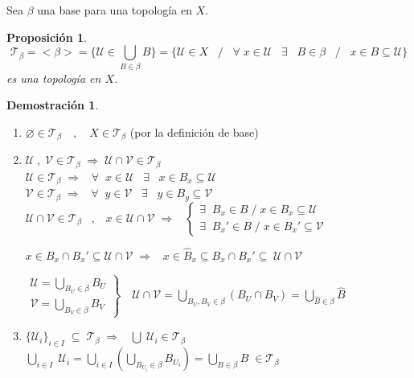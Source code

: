 \documentclass[12pt,twoside]{report}
\newcommand\mc[1]{\mathcal{#1}}
\theoremstyle{azul}
\theoremstyle{azul2}
\theoremstyle{plain}
\newtheorem*{prop}{Proposición}
\theoremstyle{definition}
\newtheorem*{dem}{Demostración}
\theoremstyle{remark}
\begin{document}
Sea $\beta$ una base para una topología en $X$.
\begin{prop}
\;
$$\mc{T}_{\beta} = < \beta > = \{ \mathcal{U} \in \underset{B \in \beta}{\bigcup} B \} = \{ \mathcal{U} \in X \;\;\; / \;\;\; \forall \; x \in \mathcal{U} \;\;\; \exists \;\;\; B \in \beta \;\;\; /\;\; \; x \in B \subseteq \mathcal{U}\}$$
es una topología en $X$.
\end{prop}
\begin{dem} \:
\begin{enumerate} 
\item $\varnothing \in \mc{T}_{\beta} \quad , \quad X \in \mc{T}_{\beta}$ (por la definición de base)
\item $\mathcal{U} \; ,\; \mathcal{V} \in \mc{T}_{\beta} \; \Rightarrow \; \mathcal{U} \cap \mathcal{V} \in \mc{T}_{\beta}$ \\
$\mathcal{U} \in \mc{T}_{\beta} \; \Rightarrow \;\;\; \forall \;\; x \in \mathcal{U}  \;\;\; \exists \;\;\; x \in B_x \subseteq \mathcal{U}$ \\
$\mathcal{V} \in \mc{T}_{\beta} \; \Rightarrow \;\;\; \forall \;\; y \in \mathcal{V}  \;\;\; \exists \;\;\; y \in B_y \subseteq \mathcal{V}$ \\
\vspace{3mm}$ \mathcal{U} \cap \mathcal{V} \in \mc{T}_{\beta} \;\;\; , \;\;\; x \in  \mathcal{U} \cap \mathcal{V} \; \Rightarrow \;\;\; \left\{ \begin{array}{l}
      \exists \;\; B_x \in B \; / \; x \in B_x \subseteq \mathcal{U}   \\
      \exists \;\; B_x' \in B \; / \; x \in B_x' \subseteq \mathcal{V} 
\end{array} \right.$\vspace{3mm}

$x \in B_x \cap B_x' \subseteq \mathcal{U} \cap \mathcal{V} \; \Rightarrow \;\;\; x \in \hat{B}_x \subseteq B_x \cap B_x' \subseteq \; \mathcal{U} \cap \mathcal{V}$\\ \vspace{3mm}

$\left. \begin{array}{cc}
     \mathcal{U} = \underset{B_U \in \beta}{\bigcup} B_U  \\
     \mathcal{V} = \underset{B_V \in \beta}{\bigcup} B_V 
\end{array} \right\} \quad \mathcal{U} \cap \mathcal{V} = \underset{B_U, B_V \in \beta}{\bigcup} (B_U \cap B_V) = \underset{\hat{B} \in \beta}{\bigcup} \hat{B}$
\vspace{3mm}
\item $\{ \mathcal{U}_i \}_{i \in I} \; \subseteq \; \mc{T}_{\beta} \; \Rightarrow \;\;\; \bigcup \; \mathcal{U}_i \in \mc{T}_{\beta}$ \\
$\underset{i \in I}{\bigcup} \; \mathcal{U}_i = \underset{i \in I}{\bigcup}(\underset{B_{U_i} \in \beta}{\bigcup} B_{U_i} ) = \underset{B \in \beta}{\bigcup} B \; \in \mc{T}_{\beta}$ \\
\end{enumerate}
\end{dem}
\end{document}
